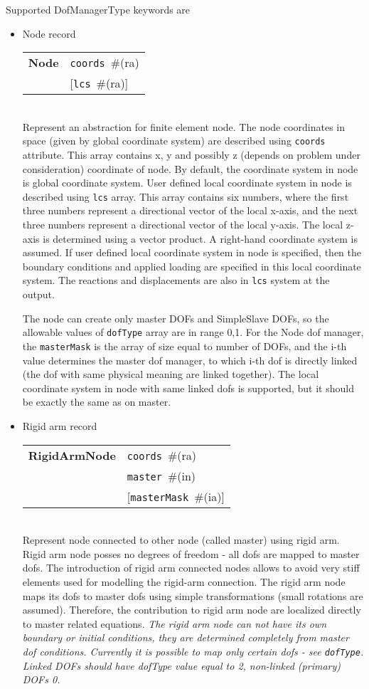 \documentclass[a4paper]{article}
\newcommand{\param}[1]{\texttt{#1}} %
\newcommand{\optional}[1]{[#1]} %
\newcommand{\field}[2]{\param{#1}~\#{\tiny(#2)}} %
\newcommand{\optField}[2]{\optional{\field{#1}{#2}}}
\newcommand{\entKeywordInst}[1]{\textbf{#1}} %
\newenvironment{record}[1][]{\begin{tabular}{|ll}}{\end{tabular}\\}
\newcommand{\recentry}[2]{{#1}&{#2}\\}
\newcounter{rcc}
\newenvironment{record}[1][\textwidth]{\setcounter{rcc}{0}\rowcolors{1}{lightgray}{lightgray}\tabularx{#1}{llR} \hline}
               {\endtabularx}
\newcommand{\recentry}[2]{\ifthenelse{\value{rcc}>0}{$\backslash$ \\}{\setcounter{rcc}{1}}{#1}&{#2}&}
\begin{document}
Supported DofManagerType keywords are
\begin{itemize}
\item Node record

\begin{record}[0.9\textwidth]
  \recentry{\entKeywordInst{Node}}{\field{coords}{ra}}
  \recentry{}{[\field{lcs}{ra}]}
\end{record}
Represent an abstraction for finite element node.
The node coordinates in space (given by global coordinate system) are described
using \param{coords} attribute. This array contains x, y and possibly z
(depends on problem under consideration) coordinate of node.
By default, the coordinate system in node is global coordinate system.
User defined local coordinate system in node is described using \param{lcs} array. This
array contains six numbers, where the first three numbers represent
a directional vector of the local x-axis, and the next three numbers represent
a directional vector of the local y-axis. The local z-axis is determined
using a vector product. A right-hand coordinate system is assumed.
If user defined local coordinate system in node is specified, then the
boundary conditions and applied loading are specified in this local coordinate system.
The reactions and displacements are also in \param{lcs} system at the output.

The node can create only master DOFs and SimpleSlave DOFs, so the
allowable values of \param{dofType} array are in range {0,1}.
For the Node dof manager, the \param{masterMask} is the array of size
equal to number of DOFs, and the i-th value determines the
master dof manager, to which i-th dof is directly linked (the dof with
same physical meaning are linked together).
The local coordinate
system in node with same linked dofs is supported, but it should be exactly the
same as on master.


\item Rigid arm record

\begin{record}[0.9\textwidth]
  \recentry{\entKeywordInst{RigidArmNode}}{\field{coords}{ra}}
  \recentry{}{\field{master}{in}}
  \recentry{}{\optField{masterMask}{ia}}
\end{record}
Represent node connected to other node (called master) using rigid
arm. Rigid arm node posses no degrees of freedom - all dofs are mapped to master
dofs. The introduction of rigid arm connected nodes allows to avoid very
stiff elements used for modelling the rigid-arm connection.
The rigid arm node maps its dofs to master dofs using simple transformations
(small rotations are assumed). Therefore, the contribution to rigid
arm node are localized directly to master related equations.
{\em The rigid arm node can not have its own boundary or initial conditions, they are
determined completely from master dof conditions. Currently it is
possible to map only certain dofs - see \param{dofType}. Linked DOFs
should have dofType value equal to 2, non-linked (primary) DOFs 0.}


\end{itemize}
\end{document}
